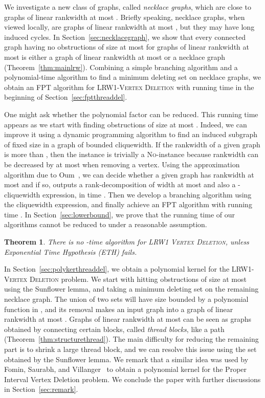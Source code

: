 \documentclass[11pt]{article}
\newtheorem{theorem}{Theorem}[section]
\theoremstyle{remark}
\newcommand{\LRWD}{\textsc{LRW1-Vertex Deletion} }
\newcommand{\NO}{\textsc{No}}
\begin{document}
We investigate a new class of graphs, called \emph{necklace graphs}, which are close to graphs of linear rankwidth at most . 
Briefly speaking, necklace graphs, when viewed locally, are graphs of linear rankwidth at most , but they may have long induced cycles.
In Section~\ref{sec:necklacegraph}, we show that every connected graph having no obstructions of size at most  for graphs of linear rankwidth at most  is either a graph of linear rankwidth at most  or a necklace graph (Theorem~\ref{thm:mainlrw}).
Combining a simple branching algorithm and a polynomial-time algorithm to find a minimum deleting set on necklace graphs, we obtain an FPT algorithm for \LRWD with running time 
in the beginning of Section~\ref{sec:fptthreaddel}. 

One might ask whether the polynomial factor  can be reduced.
This running time appears as we start with finding obstructions of size at most .
Indeed, we can improve it using a dynamic programming algorithm to find an induced subgraph of fixed size in a graph of bounded cliquewidth.
If the rankwidth of a given graph is more than , then the instance is trivially a \NO-instance because rankwidth can be decreased by at most  when removing a vertex.
Using the approximation algorithm due to Oum~\cite{Oum2006}, 
we can decide whether a given graph has rankwidth at most  and if so, outputs a rank-decomposition of width at most  and
also a -cliquewidth expression, in time .
Then we develop a branching algorithm using the cliquewidth expression, and
finally achieve an FPT algorithm with running time .
In Section~\ref{sec:lowerbound}, we prove that the running time of our algorithms cannot be reduced to  under a reasonable assumption.
\begin{theorem}
There is no -time algorithm for \textsc{LRW1 Vertex Deletion}, unless Exponential Time Hypothesis (ETH) fails.
\end{theorem}






In Section~\ref{sec:polykerthreaddel}, we obtain a polynomial kernel for the \LRWD problem. We start with hitting obstructions of size at most  using the Sunflower lemma, and taking a minimum deleting set on the remaining necklace graph. The union of two sets will have size bounded by a polynomial function in , and its removal makes an input graph into a graph of linear rankwidth at most . 
Graphs of linear rankwidth at most  can be seen as graphs obtained by connecting certain blocks, called \emph{thread blocks}, like a path (Theorem~\ref{thm:structurethread}).
The main difficulty for reducing the remaining part is to shrink a large thread block, and 
we can resolve this issue using the set obtained by the Sunflower lemma.
We remark that a similar idea was used by Fomin, Saurabh, and Villanger~\cite{FSV2012} to obtain a polynomial kernel for the {\sc Proper Interval Vertex Deletion} problem.
We conclude the paper with further discussions in Section~\ref{sec:remark}.
\end{document}
